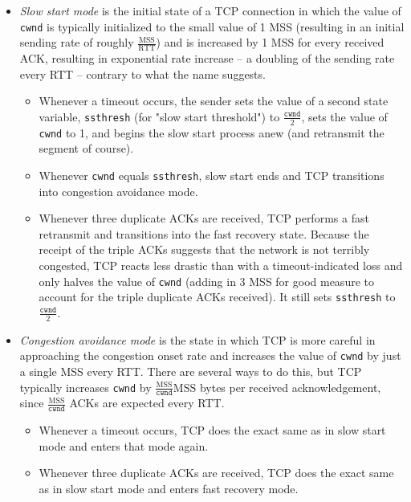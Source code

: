 \documentclass[8pt, table, xcdraw]{article}%
\begin{document}
\begin{itemize}
    \begin{itemize}
        \item \emph{Slow start mode} is the initial state of a TCP connection in which the value of \lstinline{cwnd} is typically initialized to the small value of 1 MSS (resulting in an initial sending rate of roughly $\frac{\text{MSS}}{\text{RTT}}$) and is increased by 1 MSS for every received ACK, resulting in exponential rate increase -- a doubling of the sending rate every RTT -- contrary to what the name suggests.
        \begin{itemize}
            \item Whenever a timeout occurs, the sender sets the value of a second state variable, \lstinline{ssthresh} (for "slow start threshold") to $\frac{\mathtt{cwnd}}{2}$, sets the value of \lstinline{cwnd} to 1, and begins the slow start process anew (and retransmit the segment of course).
            \item Whenever \lstinline{cwnd} equals \lstinline{ssthresh}, slow start ends and TCP transitions into congestion avoidance mode.
            \item Whenever three duplicate ACKs are received, TCP performs a fast retransmit and transitions into the fast recovery state. Because the receipt of the triple ACKs suggests that the network is not terribly congested, TCP reacts less drastic than with a timeout-indicated loss and only halves the value of \lstinline{cwnd} (adding in 3 MSS for good measure to account for the triple duplicate ACKs received). It still sets \lstinline{ssthresh} to $\frac{\mathtt{cwnd}}{2}$.
        \end{itemize}
        \item \emph{Congestion avoidance mode} is the state in which TCP is more careful in approaching the congestion onset rate and increases the value of \lstinline{cwnd} by just a single MSS every RTT. There are several ways to do this, but TCP typically increases \lstinline{cwnd} by $\frac{\text{MSS}}{\mathtt{cwnd}} \text{MSS}$ bytes per received acknowledgement, since $\frac{\text{MSS}}{\mathtt{cwnd}}$ ACKs are expected every RTT.
        \begin{itemize}
            \item Whenever a timeout occurs, TCP does the exact same as in slow start mode and enters that mode again.
            \item Whenever three duplicate ACKs are received, TCP does the exact same as in slow start mode and enters fast recovery mode.
        \end{itemize}

\end{itemize}
\end{itemize}
\end{document}
